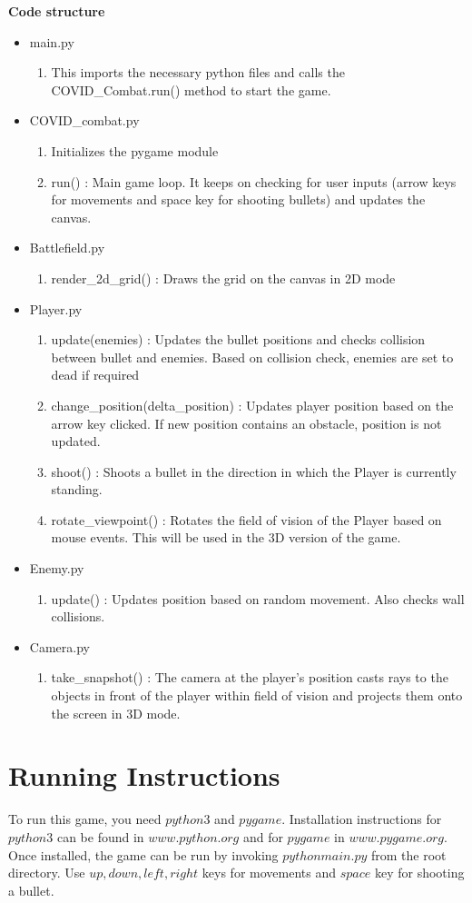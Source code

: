 \documentclass{article}
\begin{document}
\textbf{Code structure}
\begin{itemize}
	\item main.py
	\begin{enumerate}
		\item This imports the necessary python files and calls the COVID\_Combat.run() method to start the game.
	\end{enumerate}
	\item COVID\_combat.py 
	\begin{enumerate}
		\item Initializes the pygame module
		\item run() : Main game loop. It keeps on checking for user inputs (arrow keys for movements and space key for shooting bullets) and updates the canvas.
	\end{enumerate}
	\item Battlefield.py
	\begin{enumerate}
		\item render\_2d\_grid() : Draws the grid on the canvas in 2D mode
	\end{enumerate}
	\item Player.py
	\begin{enumerate}
		\item update(enemies) : Updates the bullet positions and checks collision between bullet and enemies. Based on collision check, enemies are set to dead if required
		\item change\_position(delta\_position) : Updates player position based on the arrow key clicked. If new position contains an obstacle, position is not updated.
		\item shoot() : Shoots a bullet in the direction in which the Player is currently standing.
		\item rotate\_viewpoint() : Rotates the field of vision of the Player based on mouse events. This will be used in the 3D version of the game.
	\end{enumerate}
	\item Enemy.py
	\begin{enumerate}
		\item update() : Updates position based on random movement. Also checks wall collisions.
	\end{enumerate}
	\item Camera.py
	\begin{enumerate}
		\item take\_snapshot() : The camera at the player's position casts rays to the objects in front of the player within field of vision and projects them onto the screen in 3D mode.
	\end{enumerate}
\end{itemize}

\section{Running Instructions}
To run this game, you need $python3$ and $pygame$. Installation instructions for $python3$ can be found in $www.python.org$ and for $pygame$ in $www.pygame.org$. Once installed, the game can be run by invoking $python main.py$ from the root directory. Use $up, down, left, right$ keys for movements and $space$ key for shooting a bullet. 
\end{document}
